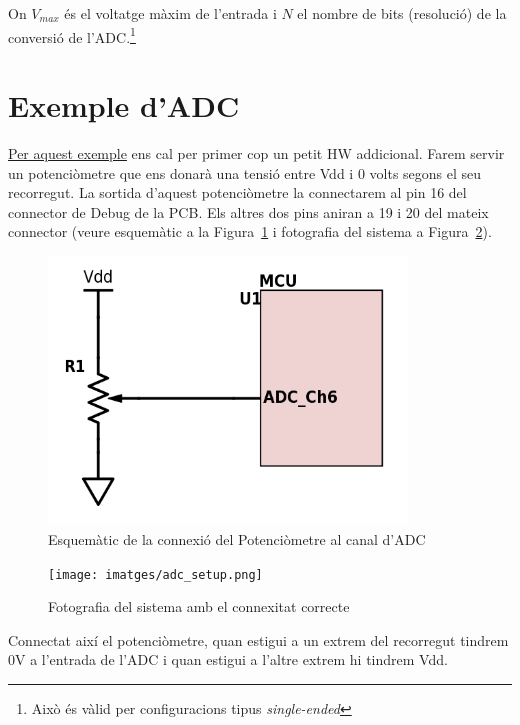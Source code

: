 On $V_{max}$ és el voltatge màxim de l'entrada i $N$ el nombre de bits (resolució) de la conversió de l'ADC.\footnote{Això és vàlid per configuracions tipus {\em single-ended}}

\section{Exemple d'ADC}
\label{sub:ADC_example}
\href{https://github.com/mariusmm/cursembedded/tree/master/Simplicity/ADC_1s}{Per aquest exemple} ens cal per primer cop un petit HW addicional. Farem servir un potenciòmetre que ens donarà una tensió entre Vdd i 0 volts segons el seu recorregut. La sortida d'aquest potenciòmetre la connectarem al pin 16 del connector de Debug de la PCB. Els altres dos pins aniran a 19 i 20 del mateix connector (veure esquemàtic a la Figura~\ref{fig:sch_adc} i fotografia del sistema a Figura~\ref{fig:setup_adc}).

\begin{figure}
 \centering
 \includegraphics[width=0.85\textwidth, keepaspectratio]{imatges/adc_schematic.png}
 \caption{Esquemàtic de la connexió del Potenciòmetre al canal d'\gls{ADC}}
 \label{fig:sch_adc}
\end{figure}

\begin{figure}
 \centering
 \texttt{[image: imatges/adc\_setup.png]}
 \caption{Fotografia del sistema amb el connexitat correcte}
 \label{fig:setup_adc}
\end{figure}

Connectat així el potenciòmetre, quan estigui a un extrem del recorregut tindrem 0V a l'entrada de l'ADC i quan estigui a l'altre extrem hi tindrem \gls{Vdd}.

